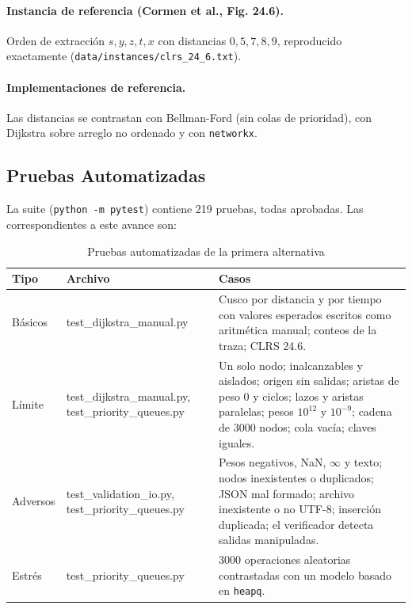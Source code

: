 \paragraph{Instancia de referencia (Cormen et al., Fig. 24.6).} Orden de extracción $s, y, z, t, x$ con distancias $0, 5, 7, 8, 9$, reproducido exactamente (\texttt{data/instances/clrs\_24\_6.txt}).

\paragraph{Implementaciones de referencia.} Las distancias se contrastan con Bellman-Ford (sin colas de prioridad), con Dijkstra sobre arreglo no ordenado y con \texttt{networkx}.

\subsection{Pruebas Automatizadas}
La suite (\texttt{python -m pytest}) contiene 219 pruebas, todas aprobadas. Las correspondientes a este avance son:
\begin{table}[H]
    \caption{Pruebas automatizadas de la primera alternativa}
    \label{tab:pruebas_avance4}
    \begin{tabularx}{\textwidth}{@{}>{\raggedright\arraybackslash}p{1.8cm}>{\ttfamily\small\raggedright\arraybackslash}p{4.4cm}X@{}}
        \toprule
        \textbf{Tipo} & \textbf{Archivo} & \textbf{Casos} \\
        \midrule
        Básicos & test\_\allowbreak{}dijkstra\_\allowbreak{}manual.py & Cusco por distancia y por tiempo con valores esperados escritos como aritmética manual; conteos de la traza; CLRS 24.6. \\
        Límite & test\_\allowbreak{}dijkstra\_\allowbreak{}manual.py, \allowbreak test\_\allowbreak{}priority\_\allowbreak{}queues.py & Un solo nodo; inalcanzables y aislados; origen sin salidas; aristas de peso 0 y ciclos; lazos y aristas paralelas; pesos $10^{12}$ y $10^{-9}$; cadena de 3000 nodos; cola vacía; claves iguales. \\
        Adversos & test\_\allowbreak{}validation\_\allowbreak{}io.py, \allowbreak test\_\allowbreak{}priority\_\allowbreak{}queues.py & Pesos negativos, NaN, $\infty$ y texto; nodos inexistentes o duplicados; JSON mal formado; archivo inexistente o no UTF-8; inserción duplicada; el verificador detecta salidas manipuladas. \\
        Estrés & test\_\allowbreak{}priority\_\allowbreak{}queues.py & 3000 operaciones aleatorias contrastadas con un modelo basado en \texttt{heapq}. \\
        \bottomrule
    \end{tabularx}
\end{table}

